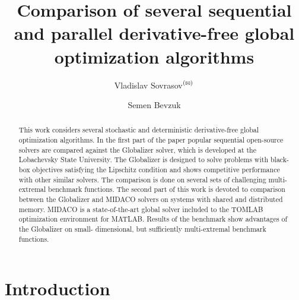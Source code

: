 \documentclass{svproc}
\def\letter{$^{\textrm{(\Letter)}}$}
\begin{document}
\mainmatter              %
%
\title{Comparison of several sequential and parallel derivative-free global optimization algorithms}
%
%
\author{Vladislav Sovrasov\letter \and Semen Bevzuk}
%
%
%

\maketitle              %

\begin{abstract}
This work considers several stochastic and deterministic derivative-free global optimization
algorithms. In the first part of the paper popular sequential open-source solvers are compared against
the Globalizer solver, which is developed at the Lobachevsky State University. The Globalizer is
designed to solve problems with black-box objectives satisfying the Lipschitz condition and shows
competitive performance with other similar solvers. The comparison is done on several sets of
challenging multi-extremal benchmark functions. The second part of this work is devoted to
comparison between the Globalizer and MIDACO solvers on systems with shared and distributed
memory. MIDACO is a state-of-the-art global solver included to the TOMLAB optimization
environment for MATLAB. Results of the benchmark show advantages of the Globalizer on small-
dimensional, but sufficiently multi-extremal benchmark functions.
\end{abstract}
%
\section{Introduction}
\end{document}
